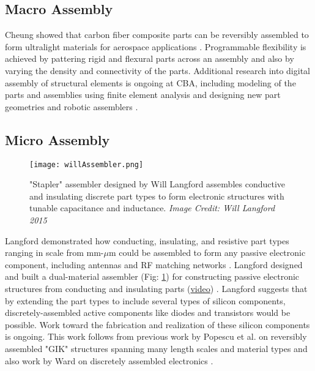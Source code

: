 {\subsection{Macro Assembly}

Cheung showed that carbon fiber composite parts can be reversibly assembled to form ultralight materials for aerospace applications \cite{Cheung2013}.  Programmable flexibility is achieved by pattering rigid and flexural parts across an assembly and also by varying the density and connectivity of the parts.  Additional research into digital assembly of structural elements is ongoing at CBA, including modeling of the parts and assemblies using finite element analysis \cite{Calisch2014} and designing new part geometries and robotic assemblers \cite{Carney2015}.

\subsection{Micro Assembly}

\begin{figure}
  \texttt{[image: willAssembler.png]}
  \caption{"Stapler" assembler designed by Will Langford assembles conductive and insulating discrete part types to form electronic structures with tunable capacitance and inductance.  \textit{Image Credit: Will Langford 2015}}
  \label{fig:willAssembler}
\end{figure}



Langford demonstrated how conducting, insulating, and resistive part types ranging in scale from mm-$\mu$m could be assembled to form any passive electronic component, including antennas and RF matching networks \cite{Langford2014}.  Langford designed and built a dual-material assembler (Fig: \ref{fig:willAssembler}) for constructing passive electronic structures from conducting and insulating parts (\href{http://dma.cba.mit.edu/stapler/video/dualstapler_full_1.mp4}{video}) \cite{LangfordWillGhassaeiAmandaGershenfeld2016}.  Langford suggests that by extending the part types to include several types of silicon components, discretely-assembled active components like diodes and transistors would be possible.  Work toward the fabrication and realization of these silicon components is ongoing.  This work follows from previous work by Popescu et al. on reversibly assembled "GIK" structures spanning many length scales and material types \cite{Popescu} and also work by Ward on discretely assembled electronics \cite{Ward2010}.
\\

}
